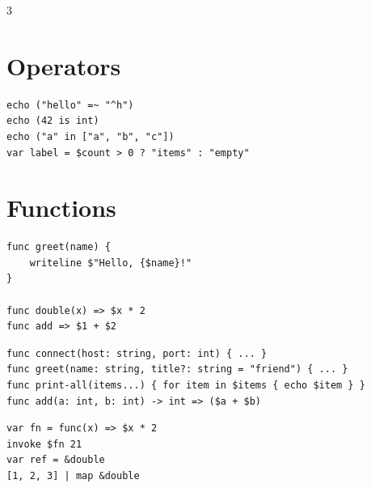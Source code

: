 \begin{multicols*}{3}
\section{Operators}

\begin{lstlisting}
echo ("hello" =~ "^h")
echo (42 is int)
echo ("a" in ["a", "b", "c"])
var label = $count > 0 ? "items" : "empty"
\end{lstlisting}

\section{Functions}
\begin{lstlisting}
func greet(name) {
    writeline $"Hello, {$name}!"
}

func double(x) => $x * 2
func add => $1 + $2
\end{lstlisting}

\begin{lstlisting}
func connect(host: string, port: int) { ... }
func greet(name: string, title?: string = "friend") { ... }
func print-all(items...) { for item in $items { echo $item } }
func add(a: int, b: int) -> int => ($a + $b)
\end{lstlisting}

\begin{lstlisting}
var fn = func(x) => $x * 2
invoke $fn 21
var ref = &double
[1, 2, 3] | map &double
\end{lstlisting}


\end{multicols*}
\newpage

